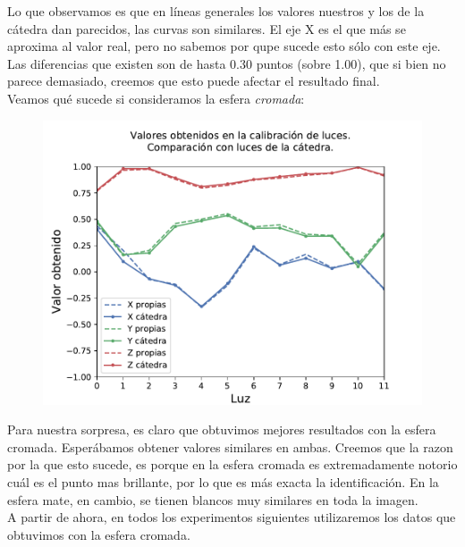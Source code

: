 Lo que observamos es que en líneas generales los valores nuestros y los de la cátedra dan parecidos, las curvas son similares. El eje X es el que más se aproxima al valor real, pero no sabemos por qupe sucede esto sólo con este eje. Las diferencias que existen son de hasta 0.30 puntos (sobre 1.00), que si bien no parece demasiado, creemos que esto puede afectar el resultado final. \\

Veamos qué sucede si consideramos la esfera \textit{cromada}:

{\centering
\begin{figure}[H]
\centering
    \includegraphics[scale=0.80]{informe/imagenes/lucesComparacionFinal.pdf}
    \end{figure}
}

Para nuestra sorpresa, es claro que obtuvimos mejores resultados con la esfera cromada. Esperábamos obtener valores similares en ambas. Creemos que la razon por la que esto sucede, es porque en la esfera cromada es extremadamente notorio cuál es el punto mas brillante, por lo que es más exacta la identificación. En la esfera mate, en cambio, se tienen blancos muy similares en toda la imagen. \\

A partir de ahora, en todos los experimentos siguientes utilizaremos los datos que obtuvimos con la esfera cromada. \\


\newpage
